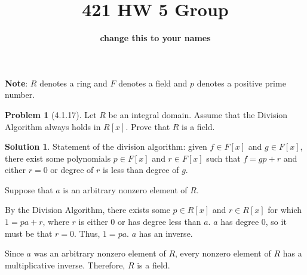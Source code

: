 \documentclass[12pt]{article}
\theoremstyle{definition}
\newtheorem*{prob}{Problem}
\newtheorem*{soln}{Solution}
\newcommand{\ZZ}{{\mathbb{Z}}}
\newcommand{\QQ}{{\mathbb{Q}}}
\begin{document}
%
\title{421 HW 5 Group}
\author{\textbf{change this to your names}}

\date{}

\maketitle

\textbf{Note}: $R$ denotes a ring and $F$ denotes a field and $p$ denotes a positive
prime number.

%
%
%



%
%


\begin{prob}[4.1.17]
Let $R$ be an integral domain. 
Assume that the Division Algorithm always holds in $R[x]$. Prove that $R$ is a field.
\end{prob}

\begin{soln}

Statement of the division algorithm:
given $f\in F[x]$ and $g\in F[x]$,
there exist some polynomials $p\in F[x]$ and $r\in F[x]$
such that $f=gp+r$ and either $r=0$ or degree of $r$ is less than degree of $g$.

Suppose that $a$ is an arbitrary nonzero element of $R$.

By the Division Algorithm,
there exists some $p\in R[x]$ and $r\in R[x]$ for which $1=pa+r$,
where $r$ is either $0$ or has degree less than $a$.
$a$ has degree $0$, so it must be that $r=0$.
Thus, $1=pa$.
$a$ has an inverse.

Since $a$ was an arbitrary nonzero element of $R$,
every nonzero element of $R$ has a multiplicative inverse.
Therefore, $R$ is a field.

\end{soln}
\end{document}
